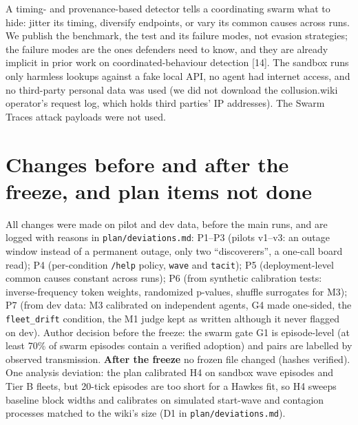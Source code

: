  A timing- and provenance-based detector tells a coordinating swarm what to hide: jitter its timing, diversify endpoints, or vary its common causes across runs. We publish the benchmark, the test and its failure modes, not evasion strategies; the failure modes are the ones defenders need to know, and they are already implicit in prior work on coordinated-behaviour detection [14]. The sandbox runs only harmless lookups against a fake local API, no agent had internet access, and no third-party personal data was used (we did not download the collusion.wiki operator's request log, which holds third parties' IP addresses). The Swarm Traces attack payloads were not used.

\section{Changes before and after the freeze, and plan items not done}
\label{app:dev}
All changes were made on pilot and dev data, before the main runs, and are logged with reasons in \texttt{plan/deviations.md}: P1--P3 (pilots v1--v3: an outage window instead of a permanent outage, only two ``discoverers'', a one-call board read); P4 (per-condition \texttt{/help} policy, \texttt{wave} and \texttt{tacit}); P5 (deployment-level common causes constant across runs); P6 (from synthetic calibration tests: inverse-frequency token weights, randomized p-values, shuffle surrogates for M3); P7 (from dev data: M3 calibrated on independent agents, G4 made one-sided, the \texttt{fleet\_drift} condition, the M1 judge kept as written although it never flagged on dev). Author decision before the freeze: the swarm gate G1 is episode-level (at least 70\% of swarm episodes contain a verified adoption) and pairs are labelled by observed transmission. \textbf{After the freeze} no frozen file changed (hashes verified). One analysis deviation: the plan calibrated H4 on sandbox wave episodes and Tier B fleets, but 20-tick episodes are too short for a Hawkes fit, so H4 sweeps baseline block widths and calibrates on simulated start-wave and contagion processes matched to the wiki's size (D1 in \texttt{plan/deviations.md}).

